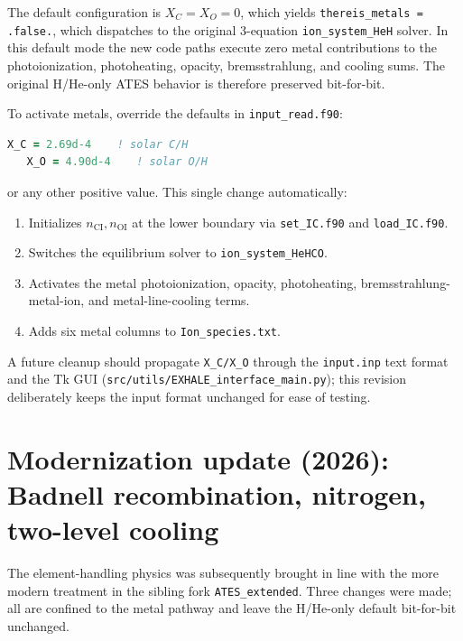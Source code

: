 \documentclass[english,a4paper]{my_memo}
\begin{document}
The default configuration is \(X_C = X_O = 0\), which yields
\texttt{thereis\_metals = .false.}, which dispatches to the original
3-equation \texttt{ion\_system\_HeH} solver.  In this default mode the
new code paths execute zero metal contributions to the
photoionization, photoheating, opacity, bremsstrahlung, and cooling
sums.  The original H/He-only ATES behavior is therefore preserved
bit-for-bit.

To activate metals, override the defaults in \texttt{input\_read.f90}:
\begin{lstlisting}[language=Fortran]
   X_C = 2.69d-4    ! solar C/H
   X_O = 4.90d-4    ! solar O/H
\end{lstlisting}
or any other positive value.  This single change automatically:
\begin{enumerate}
  \item Initializes \(n_\mathrm{CI}, n_\mathrm{OI}\) at the lower
    boundary via \texttt{set\_IC.f90} and \texttt{load\_IC.f90}.
  \item Switches the equilibrium solver to
    \texttt{ion\_system\_HeHCO}.
  \item Activates the metal photoionization, opacity, photoheating,
    bremsstrahlung-metal-ion, and metal-line-cooling terms.
  \item Adds six metal columns to \texttt{Ion\_species.txt}.
\end{enumerate}
\begin{sloppypar}
A future cleanup should propagate \texttt{X\_C/X\_O} through the
\texttt{input.inp} text format and the Tk GUI
(\texttt{src/utils/EXHALE\_interface\_main.py}); this revision
deliberately keeps the input format unchanged for ease of testing.
\end{sloppypar}

\section{Modernization update (2026): Badnell recombination, nitrogen,
two-level cooling}
\label{sec:modernization}

The element-handling physics was subsequently brought in line with the
more modern treatment in the sibling fork \texttt{ATES\_extended}.  Three
changes were made; all are confined to the metal pathway and leave the
H/He-only default bit-for-bit unchanged.
\end{document}
